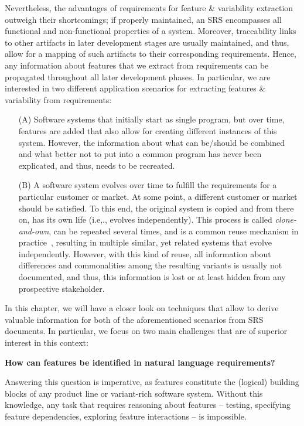 \documentclass[graybox]{svmult}
\begin{document}
Nevertheless, the advantages of requirements for feature \& variability extraction outweigh their shortcomings; if properly maintained, an SRS encompasses all functional and non-functional properties of a system.
Moreover, traceability links to other artifacts in later development stages are usually maintained, and thus, allow for a mapping of such artifacts to their corresponding requirements.
Hence, any information about features that we extract from requirements can be propagated throughout all later development phases.
In particular, we are interested in two different application scenarios for extracting features \& variability from requirements:
\begin{itemize}
    \item[(A)] 
    Software systems that initially start as single program, but over time, features are added that also allow for creating different instances of this system. However, the information about what can be/should be combined and what better not to put into a common program has never been explicated, and thus, needs to be recreated.
    \item[(B)] 
    A software system evolves over time to fulfill the requirements for a particular customer or market.
    At some point, a different customer or market should be satisfied. 
    To this end, the original system is copied and from there on, has its own life (i.e,., evolves independently).
    This process is called \textit{clone-and-own}, can be repeated several times, and is a common reuse mechanism in practice~\cite{DubinskyRBDBC13}, resulting in multiple similar, yet related systems that evolve independently.
    However, with this kind of reuse, all information about differences and commonalities among the resulting variants is usually not documented, and thus, this information is lost or at least hidden from any prospective stakeholder.
\end{itemize}

In this chapter, we will have a closer look on techniques that allow to derive valuable information for both of the aforementioned scenarios from SRS documents. In particular, we focus on two main challenges that are of superior interest in this context:
\begin{center}
    \textbf{How can features be identified in natural language requirements?}
\end{center}
Answering this question is imperative, as features constitute the (logical) building blocks of any product line or variant-rich software system.
Without this knowledge, any task that requires reasoning about features -- testing, specifying feature dependencies, exploring feature interactions -- is impossible.
\end{document}
